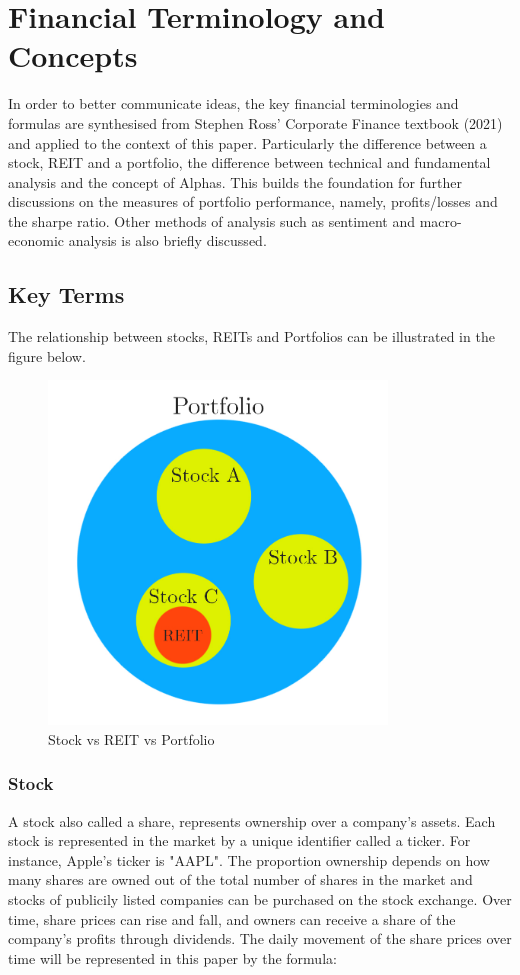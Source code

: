 \documentclass[a4paper,12pt]{report}
\numberwithin{equation}{section}
\theoremstyle{definition}
\begin{document}
\setcounter{page}{3}
\chapter{Financial Terminology and Concepts}
In order to better communicate ideas, the key financial terminologies and formulas are synthesised from Stephen Ross' Corporate Finance textbook (2021) and applied to the context of this paper. Particularly the difference between a stock, REIT and a portfolio, the difference between technical and fundamental analysis and the concept of Alphas. This builds the foundation for further discussions on the measures of portfolio performance, namely, profits/losses and the sharpe ratio. Other methods of analysis such as sentiment and macro-economic analysis is also briefly discussed. 
\section{Key Terms}
The relationship between stocks, REITs and Portfolios can be illustrated in the figure below.
\begin{figure}[H]
  \centerline{\includegraphics[width=9cm]{Stock_Porfolio_Reit}}
  \caption{Stock vs REIT vs Portfolio}
  \label{fig:Stock_Porfolio_Reit}
  \end{figure}
\subsection{Stock}
A stock also called a share, represents ownership over a company's assets. Each stock is represented in the market by a unique identifier called a ticker. For instance, Apple's ticker is "AAPL". The proportion ownership depends on how many shares are owned out of the total number of shares in the market and stocks of publicily listed companies can be purchased on the stock exchange. Over time, share prices can rise and fall, and owners can receive a share of the company's profits through dividends. The daily movement of the share prices over time will be represented in this paper by the formula:
\end{document}
